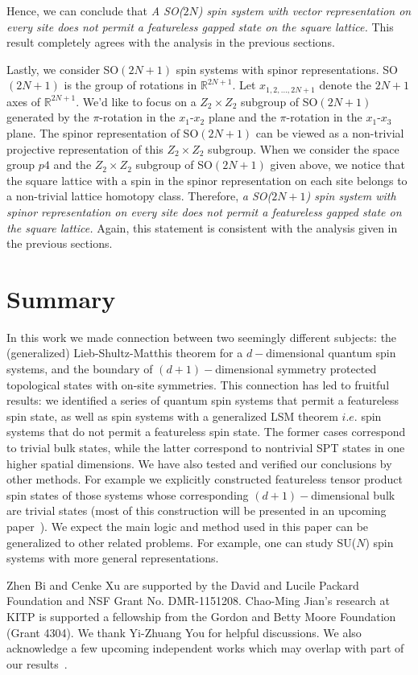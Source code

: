\documentclass[aps,prb,twocolumn,superscriptaddress,showpacs]{revtex4}
\begin{document}
Hence, we can conclude that {\it A SO($2N$) spin system with
vector representation on every site does not permit a featureless
gapped state on the square lattice. } This result completely
agrees with the analysis in the previous sections.


Lastly, we consider SO$(2N+1)$ spin systems with spinor
representations. SO$(2N+1)$ is the group of rotations in
$\mathbb{R}^{2N+1}$. Let $x_{1,2,...,2N+1}$ denote the $2N+1$ axes
of $\mathbb{R}^{2N+1}$. We'd like to focus on a $Z_2\times Z_2$
subgroup of SO$(2N+1)$ generated by the $\pi$-rotation in the
$x_1$-$x_2$ plane and the $\pi$-rotation in the $x_1$-$x_3$ plane.
The spinor representation of SO$(2N+1)$ can be viewed as a
non-trivial projective representation of this $Z_2 \times Z_2$
subgroup. When we consider the space group $p4$ and the $Z_2
\times Z_2$ subgroup of SO$(2N+1)$ given above, we notice that the
square lattice with a spin in the spinor representation on each
site belongs to a non-trivial lattice homotopy class. Therefore,
{\it a SO($2N+1$) spin system with spinor representation on every
site does not permit a featureless gapped state on the square
lattice. } Again, this statement is consistent with the analysis
given in the previous sections.




\section{Summary}

In this work we made connection between two seemingly different
subjects: the (generalized) Lieb-Shultz-Matthis theorem for a
$d-$dimensional quantum spin systems, and the boundary of
$(d+1)-$dimensional symmetry protected topological states with
on-site symmetries. This connection has led to fruitful results:
we identified a series of quantum spin systems that permit a
featureless spin state, as well as spin systems with a generalized
LSM theorem $i.e.$ spin systems that do not permit a featureless
spin state. The former cases correspond to trivial bulk states,
while the latter correspond to nontrivial SPT states in one higher
spatial dimensions. We have also tested and verified our
conclusions by other methods. For example we explicitly
constructed featureless tensor product spin states of those
systems whose corresponding $(d+1)-$dimensional bulk are trivial
states (most of this construction will be presented in an upcoming
paper~\cite{jianfuture}). We expect the main logic and method used
in this paper can be generalized to other related problems. For
example, one can study SU($N$) spin systems with more general
representations.

Zhen Bi and Cenke Xu are supported by the David and Lucile Packard
Foundation and NSF Grant No. DMR-1151208. Chao-Ming Jian's
research at KITP is supported a fellowship from the Gordon and
Betty Moore Foundation (Grant 4304). We thank Yi-Zhuang You for
helpful discussions. We also acknowledge a few upcoming
independent works which may overlap with part of our
results~\cite{maxfuture,ashvinfuture}.




\end{document}
